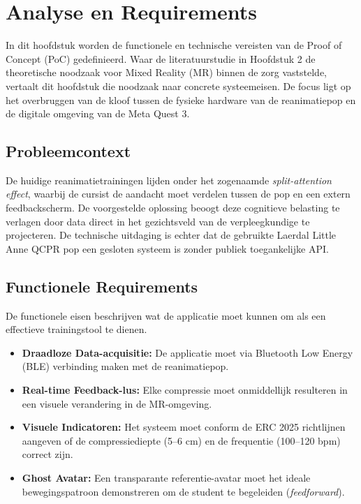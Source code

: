 \chapter{Analyse en Requirements}
\label{ch:analyse}

In dit hoofdstuk worden de functionele en technische vereisten van de Proof of Concept (PoC) gedefinieerd. 
Waar de literatuurstudie in Hoofdstuk 2 de theoretische noodzaak voor Mixed Reality (MR) binnen de zorg vaststelde, 
vertaalt dit hoofdstuk die noodzaak naar concrete systeemeisen. De focus ligt op het overbruggen van de kloof tussen de fysieke hardware van de 
reanimatiepop en de digitale omgeving van de Meta Quest 3.

\section{Probleemcontext}
De huidige reanimatietrainingen lijden onder het zogenaamde \textit{split-attention effect}, waarbij de cursist de aandacht moet verdelen tussen de 
pop en een extern feedbackscherm. De voorgestelde oplossing beoogt deze cognitieve belasting te verlagen door data direct in het gezichtsveld van de 
verpleegkundige te projecteren. De technische uitdaging is echter dat de gebruikte Laerdal Little Anne QCPR pop een gesloten systeem is zonder publiek toegankelijke API.

\section{Functionele Requirements}
De functionele eisen beschrijven wat de applicatie moet kunnen om als een effectieve trainingstool te dienen.

\begin{itemize}
    \item \textbf{Draadloze Data-acquisitie:} De applicatie moet via Bluetooth Low Energy (BLE) verbinding maken met de reanimatiepop.
    \item \textbf{Real-time Feedback-lus:} Elke compressie moet onmiddellijk resulteren in een visuele verandering in de MR-omgeving.
    \item \textbf{Visuele Indicatoren:} Het systeem moet conform de ERC 2025 richtlijnen aangeven of de compressiediepte (5--6 cm) en de frequentie (100--120 bpm) correct zijn.
    \item \textbf{Ghost Avatar:} Een transparante referentie-avatar moet het ideale bewegingspatroon demonstreren om de student te begeleiden (\textit{feedforward}).
\end{itemize}


